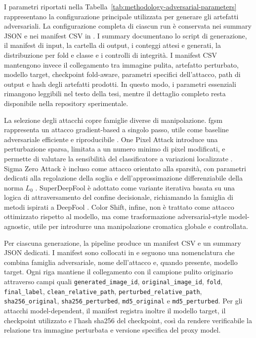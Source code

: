 I parametri riportati nella Tabella~\ref{tab:methodology-adversarial-parameters}
rappresentano la configurazione principale utilizzata per generare gli artefatti
adversariali. La configurazione completa di ciascun run è conservata nei summary
JSON e nei manifest CSV in . I summary documentano
lo script di generazione, il manifest di input, la cartella di output, i conteggi
attesi e generati, la distribuzione per fold e classe e i controlli di integrità.
I manifest CSV mantengono invece il collegamento tra immagine pulita, artefatto
perturbato, modello target, checkpoint fold-aware, parametri specifici
dell'attacco, path di output e hash degli artefatti prodotti. In questo modo, i
parametri essenziali rimangono leggibili nel testo della tesi, mentre il dettaglio
completo resta disponibile nella repository sperimentale.


La selezione degli attacchi copre famiglie diverse di manipolazione. \gls{fgsm}
rappresenta un attacco gradient-based a singolo passo, utile come baseline
adversariale efficiente e riproducibile \cite{goodfellow2015explaining}. One
Pixel Attack introduce una perturbazione sparsa, limitata a un numero minimo di
pixel modificati, e permette di valutare la sensibilità del classificatore a
variazioni localizzate \cite{su2019onepixel}. Sigma Zero Attack è incluso come
attacco orientato alla sparsità, con parametri dedicati alla regolazione della
soglia e dell'approssimazione differenziabile della norma \(L_0\)
\cite{zhao2024sigmazero}. SuperDeepFool è adottato come variante iterativa
basata su una logica di attraversamento del confine decisionale, richiamando la
famiglia di metodi ispirati a DeepFool \cite{moosavi2016deepfool}. Color Shift,
infine, non è trattato come attacco ottimizzato rispetto al modello, ma come
trasformazione adversarial-style model-agnostic, utile per introdurre una
manipolazione cromatica globale e controllata.

Per ciascuna generazione, la pipeline produce un manifest CSV e un summary JSON
dedicati. I manifest sono collocati in  e seguono una
nomenclatura che combina famiglia adversariale, nome dell'attacco e, quando
presente, modello target. Ogni riga mantiene il collegamento con il campione
pulito originario attraverso campi quali \texttt{generated\_image\_id},
\texttt{original\_image\_id}, \texttt{fold}, \texttt{final\_label},
\texttt{clean\_relative\_path}, \texttt{perturbed\_relative\_path},
\texttt{sha256\_original}, \texttt{sha256\_perturbed}, \texttt{md5\_original}
e \texttt{md5\_perturbed}. Per gli attacchi model-dependent, il manifest
registra inoltre il modello target, il checkpoint utilizzato e l'hash \gls{sha256} del
checkpoint, così da rendere verificabile la relazione tra immagine perturbata e
versione specifica del proxy model.


